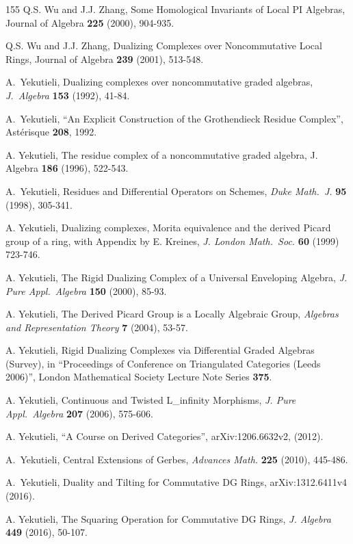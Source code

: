 \begin{thebibliography}{155}
 Q.S. Wu and J.J. Zhang,
Some Homological Invariants of Local PI Algebras,
Journal of Algebra {\bf 225} (2000), 904-935.

 Q.S. Wu and J.J. Zhang,
Dualizing Complexes over Noncommutative Local Rings,
Journal of Algebra {\bf 239} (2001), 513-548.

 A.\ Yekutieli, Dualizing complexes over noncommutative
graded algebras, {\em J.\ Algebra} \textbf{153} (1992), 41-84.

 A.\ Yekutieli, ``An Explicit Construction of the
Grothendieck Residue Complex'',
Ast\'{e}risque \textbf{208}, 1992.

 A. Yekutieli, 
The residue complex of a noncommutative graded algebra, 
J. Algebra {\bf 186} (1996), 522-543.

 A.\ Yekutieli,
Residues and Differential Operators on Schemes,
{\em Duke Math.\ J.} {\bf 95} (1998), 305-341. 

 A. Yekutieli,
Dualizing complexes, Morita equivalence and the derived Picard group of a
ring, with Appendix by E. Kreines, 
{\em J. London Math.\ Soc.} {\bf 60} (1999) 723-746.

 A. Yekutieli,
The Rigid Dualizing Complex of a Universal Enveloping Algebra,
{\em J. Pure Appl.\ Algebra} {\bf 150} (2000), 85-93.

  A. Yekutieli,
The Derived Picard Group is a Locally Algebraic Group,
{\em Algebras and Representation Theory} {\bf 7} (2004), 53-57.

 A. Yekutieli,
Rigid Dualizing Complexes via Differential Graded Algebras (Survey),
in ``Proceedings of Conference on Triangulated Categories (Leeds 2006)'',
London Mathematical Society Lecture Note Series {\bf 375}. 

  A. Yekutieli,
Continuous and Twisted L\_infinity Morphisms,
{\em J. Pure Appl.\ Algebra} {\bf 207} (2006), 575-606.

 A. Yekutieli,
``A Course on Derived Categories'',   
arXiv:1206.6632v2, (2012).

 A.\ Yekutieli, 
Central Extensions of Gerbes,
{\em Advances Math.} {\bf 225} (2010), 445-486.

 A.\ Yekutieli, 
Duality and Tilting for Commutative DG Rings,
arXiv:1312.6411v4 (2016).

 A. Yekutieli,
The Squaring Operation for Commutative DG Rings, 
{\em J. Algebra} {\bf 449} (2016), 50-107.


\end{thebibliography}
